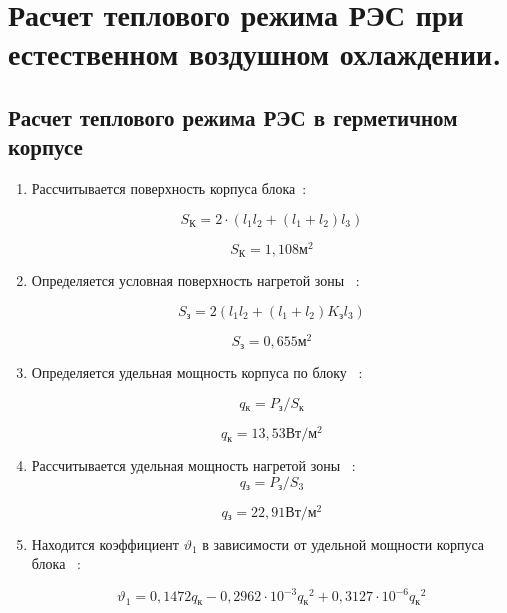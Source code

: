 \section{Расчет теплового режима РЭС при естественном воздушном охлаждении.}
\subsection{Расчет теплового режима РЭС в герметичном корпусе}
\begin{enumerate}[label={\arabic*.}]
  
\item Рассчитывается поверхность корпуса блока~\cite{Rotkop1976}:

  \begin{equation}
    S\mathrm{_{К}} = 2 \cdot (l_1 l_2 + (l_1+ l_2)l_3) %
  \end{equation}

  $$S\mathrm{_{К}}=1,108\mathrm{м^2}$$

\item Определяется условная поверхность нагретой зоны ~\cite{Rotkop1976}:

  \begin{equation}
    S\mathrm{_{з}} = 2 (l_1 l_2 + (l_1 + l_2) K\mathrm{_{з}} l_3) %
  \end{equation}

  $$S\mathrm{_{з}} = 0,655\mathrm{м^2}$$

\item Определяется удельная мощность корпуса по блоку ~\cite{Rotkop1976}:

\begin{equation}
  q\mathrm{_к} = P\mathrm{_з}/S\mathrm{_к} %
\end{equation}

$$q\mathrm{_к} = 13,53\mathrm{Вт/м^2}$$

\item Рассчитывается удельная мощность нагретой зоны ~\cite{Rotkop1976}:
  \begin{equation}
      q\mathrm{_з} = P\mathrm{_з}/S\mathrm{_3} %
    \end{equation}

    $$q\mathrm{_з} = 22,91 \mathrm{ Вт/м^2}$$

\item Находится коэффициент $\vartheta_1$ в зависимости от удельной мощности корпуса блока ~\cite{Rotkop1976}:
    
\begin{equation}
\vartheta_1 = 0,1472q\mathrm{_к} - 0,2962 \cdot 10^{-3}q\mathrm{_к}^2 + 0,3127 \cdot 10^{-6}q\mathrm{_к}^2
\end{equation}


\end{enumerate}
